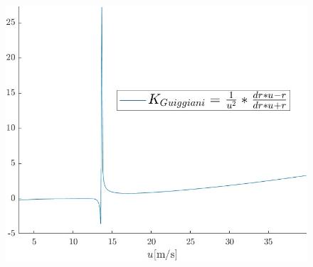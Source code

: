 \begin{figure}[!h]
    \centering
    \includegraphics[scale=0.25]{Immagini/Understeer Gradient/Kguiggiani.jpg}
    \caption{}
    \label{fig:Kguiggiani}
\end{figure}


